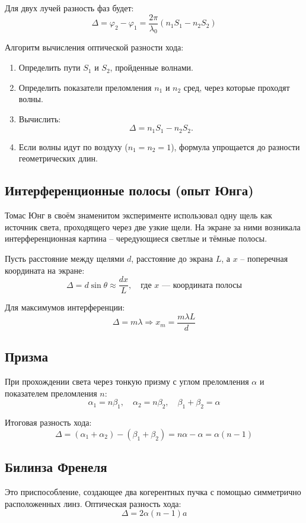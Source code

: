 \documentclass[12pt]{article}
\begin{document}
Для двух лучей разность фаз будет:
\[
\Delta = \varphi_2 - \varphi_1 = \frac{2\pi}{\lambda_0}(n_1 S_1 - n_2 S_2)
\]

Алгоритм вычисления оптической разности хода:
\begin{enumerate}
  \item Определить пути $S_1$ и $S_2$, пройденные волнами.
  \item Определить показатели преломления $n_1$ и $n_2$ сред, через которые проходят волны.
  \item Вычислить: \[ \Delta = n_1 S_1 - n_2 S_2. \]
  \item Если волны идут по воздуху ($n_1 = n_2 = 1$), формула упрощается до разности геометрических длин.
\end{enumerate}


\subsection{Интерференционные полосы (опыт Юнга)}

Томас Юнг в своём знаменитом эксперименте использовал одну щель как источник света, проходящего через две узкие щели. На экране за ними возникала интерференционная картина -- чередующиеся светлые и тёмные полосы.

Пусть расстояние между щелями $d$, расстояние до экрана $L$, а $x$ -- поперечная координата на экране:
\[
\Delta = d \sin \theta \approx \frac{d x}{L}, \quad \text{где } x \text{ --- координата полосы}
\]

Для максимумов интерференции:
\[
\Delta = m\lambda \Rightarrow x_m = \frac{m\lambda L}{d}
\]

\subsection{Призма}

При прохождении света через тонкую призму с углом преломления $\alpha$ и показателем преломления $n$:
\[
\alpha_1 = n\beta_1, \quad \alpha_2 = n\beta_2, \quad \beta_1 + \beta_2 = \alpha
\]

Итоговая разность хода:
\[
\Delta = (\alpha_1 + \alpha_2) - (\beta_1 + \beta_2) = n\alpha - \alpha = \alpha(n - 1)
\]

\subsection{Билинза Френеля}

Это приспособление, создающее два когерентных пучка с помощью симметрично расположенных линз. Оптическая разность хода:
\[
\Delta = 2\alpha(n - 1)a
\]
\end{document}
